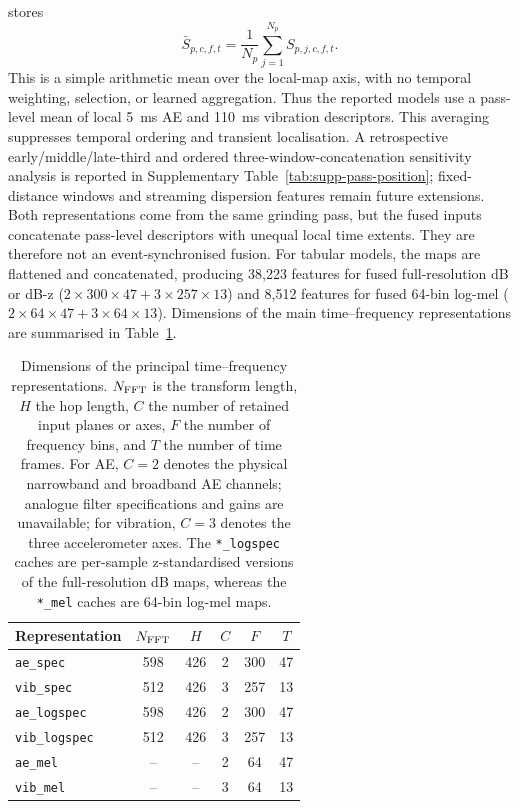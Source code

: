 stores
\begin{equation}
\bar S_{p,c,f,t}=\frac{1}{N_p}\sum_{j=1}^{N_p}S_{p,j,c,f,t}.
\label{eq:local-map-mean}
\end{equation}
This is a simple arithmetic mean over the local-map axis, with no temporal
weighting, selection, or learned aggregation. Thus the reported models use
a pass-level mean of local 5~ms AE and 110~ms vibration descriptors. This
averaging suppresses temporal ordering and transient localisation. A
retrospective early/middle/late-third and ordered three-window-concatenation
sensitivity analysis is reported in Supplementary
Table~\ref{tab:supp-pass-position}; fixed-distance windows and streaming
dispersion features remain future extensions. Both representations come
from the same grinding pass, but the fused inputs concatenate pass-level
descriptors with unequal local time extents. They are therefore not an
event-synchronised fusion. For tabular models, the maps are flattened and
concatenated, producing 38,223 features for fused full-resolution dB or dB-z
(\(2\times300\times47 + 3\times257\times13\)) and 8,512 features for fused
64-bin log-mel (\(2\times64\times47 + 3\times64\times13\)). Dimensions of the main
time--frequency representations are summarised in
Table~\ref{tbl:representation-dims}.

\begin{table}[htbp]
\centering
\caption{Dimensions of the principal time--frequency representations.
$N_{\rm FFT}$ is the transform length, $H$ the hop length, $C$ the number
of retained input planes or axes, $F$ the number of frequency bins, and
$T$ the number of time frames. For AE, $C=2$ denotes the physical narrowband and broadband AE channels; analogue filter specifications and gains are unavailable; for vibration, $C=3$ denotes the three accelerometer axes. The \texttt{*\_logspec} caches are per-sample z-standardised versions of the full-resolution dB maps, whereas the \texttt{*\_mel} caches are 64-bin log-mel maps.}
\label{tbl:representation-dims}
\begin{tabular}{@{}lccccc@{}}
\toprule
Representation & $N_{\rm FFT}$ & $H$ & $C$ & $F$ & $T$ \\
\midrule
\texttt{ae\_spec} & 598 & 426 & 2 & 300 & 47 \\
\texttt{vib\_spec} & 512 & 426 & 3 & 257 & 13 \\
\texttt{ae\_logspec} & 598 & 426 & 2 & 300 & 47 \\
\texttt{vib\_logspec} & 512 & 426 & 3 & 257 & 13 \\
\texttt{ae\_mel} & -- & -- & 2 & 64 & 47 \\
\texttt{vib\_mel} & -- & -- & 3 & 64 & 13 \\
\bottomrule
\end{tabular}
\end{table}

